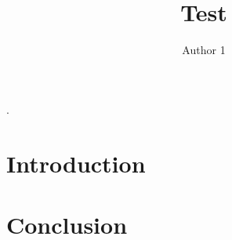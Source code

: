 \documentclass[review]{elsarticle}
\begin{document}
\begin{frontmatter}
\title{Test}
\author[myu]{Author 1}
\end{frontmatter}.

\section{Introduction}
\lipsum[1]
\section{Conclusion}
\lipsum[1]
\end{document}
